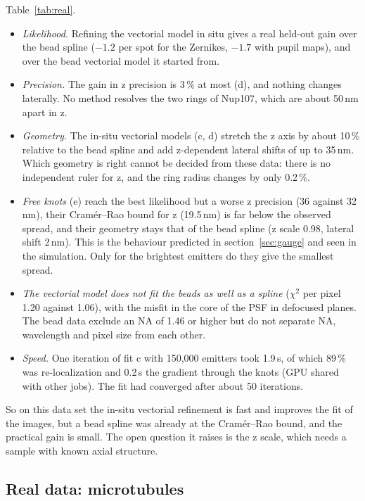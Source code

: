 \documentclass[11pt,a4paper]{article}
\begin{document}
Table~\ref{tab:real}.
\begin{itemize}\setlength\itemsep{0pt}
\item \emph{Likelihood.} Refining the vectorial model in situ gives a real held-out gain over the bead spline
($-1.2$ per spot for the Zernikes, $-1.7$ with pupil maps), and over the bead vectorial model it started from.
\item \emph{Precision.} The gain in z precision is 3\,\% at most (d), and nothing changes laterally. No method
resolves the two rings of Nup107, which are about 50\,nm apart in z.
\item \emph{Geometry.} The in-situ vectorial models (c, d) stretch the z axis by about 10\,\% relative to the
bead spline and add z-dependent lateral shifts of up to 35\,nm. Which geometry is right cannot be decided from
these data: there is no independent ruler for z, and the ring radius changes by only 0.2\,\%.
\item \emph{Free knots} (e) reach the best likelihood but a worse z precision (36 against 32\,nm), their
Cram\'er--Rao bound for z (19.5\,nm) is far below the observed spread, and their geometry stays that of the
bead spline (z scale 0.98, lateral shift 2\,nm). This is the behaviour predicted in section~\ref{sec:gauge}
and seen in the simulation. Only for the brightest emitters do they give the smallest spread.
\item \emph{The vectorial model does not fit the beads as well as a spline} ($\chi^2$ per pixel 1.20 against
1.06), with the misfit in the core of the PSF in defocused planes. The bead data exclude an NA of 1.46 or
higher but do not separate NA, wavelength and pixel size from each other.
\item \emph{Speed.} One iteration of fit c with 150{,}000 emitters took 1.9\,s, of which 89\,\% was
re-localization and 0.2\,s the gradient through the knots (GPU shared with other jobs). The fit had converged
after about 50 iterations.
\end{itemize}
So on this data set the in-situ vectorial refinement is fast and improves the fit of the images, but a bead
spline was already at the Cram\'er--Rao bound, and the practical gain is small. The open question it raises is
the z scale, which needs a sample with known axial structure.

\subsection{Real data: microtubules}
\label{sec:tub}
\end{document}
